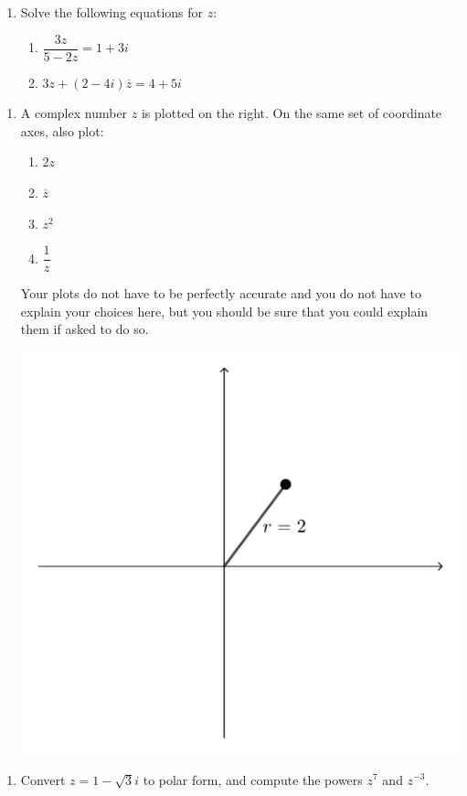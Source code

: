 \documentclass[12pt]{article}
\begin{document}
\newpage

  \begin{enumerate}
    \item Solve the following equations for $z$:
    \begin{multicols}{2}
    \begin{enumerate}
    \item $\dfrac{3z}{5-2z} = 1+3i$
    
    
    
    \item $3z+(2-4i)\overline{z} = 4+5i$

    
    

    \end{enumerate}
        \end{multicols}
        
        \vspace{2.5in}
        
  \end{enumerate}
  \begin{multicols}{2}

  \begin{enumerate}
    \addtocounter{enumi}{1}
      \item A complex number $z$ is plotted on the right. On the same set of coordinate axes, also plot:
      \begin{multicols}{2}
      \begin{enumerate}
      \item $2z$
      \item $\overline{z}$
      \item $z^2$
      \item $\dfrac{1}{z}$
      \end{enumerate}
      \end{multicols}
      Your plots do not have to be perfectly accurate and you do not have to explain your choices here, but you should be sure that you could explain them if asked to do so.
      \begin{center}
      \includegraphics[width=0.8\columnwidth]{T1-2}
      \end{center}
  \end{enumerate}
\end{multicols}

\begin{enumerate}
\addtocounter{enumi}{2}
\item Convert $z=1-\sqrt{3}i$ to polar form, and compute the powers $z^7$ and $z^{-3}$.
\end{enumerate}
  
\end{document}

